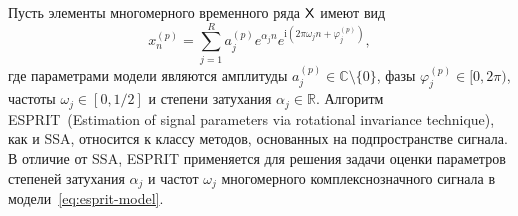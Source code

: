 \documentclass[specialist,
  substylefile=spbu_report.rtx,
subf,href,colorlinks=true, 12pt]{disser}
\theoremstyle{plain}
\theoremstyle{definition}
\theoremstyle{remark}
\newtheorem{remark}{Замечание}[section]
\newcommand{\iu}{\mathrm{i}}
\begin{document}
Пусть элементы многомерного временного ряда $\mathsf{X}$ имеют вид
\begin{equation}
  \label{eq:esprit-model}
  x_n^{(p)} = \sum_{j=1}^{R} a_j^{(p)} e^{ \alpha_j n }
  e^{\iu \left( 2 \pi \omega_j n + \varphi_j^{(p)}\right)},
\end{equation}
где параметрами модели являются амплитуды
$a_j^{(p)} \in \mathbb{C}\setminus\{0\}$, фазы ${\varphi_j^{(p)} \in
[0, 2\pi)}$,
частоты $\omega_j\in [0, 1/2]$ и степени затухания $\alpha_j \in \mathbb{R}$.
Алгоритм ESPRIT~(Estimation of signal parameters via rotational
invariance tech\-nique),
как и SSA, относится к классу методов, основанных на подпространстве сигнала.
В отличие от SSA, ESPRIT применяется для решения задачи оценки параметров
степеней затухания $\alpha_j$ и частот $\omega_j$ многомерного
комплекснозначного сигнала в модели~\eqref{eq:esprit-model}.
\end{document}
